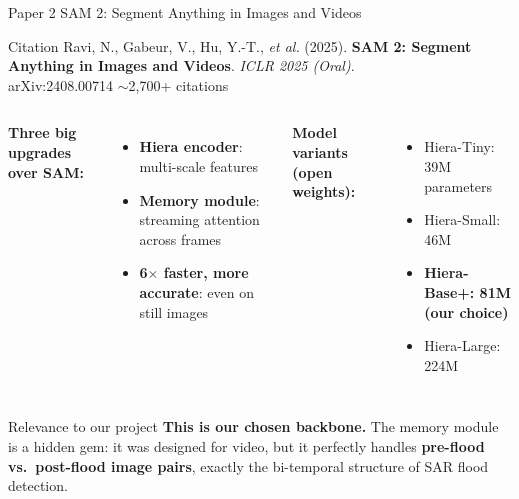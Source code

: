 \documentclass[10pt,aspectratio=169]{beamer}
\begin{document}
\begin{frame}{Paper 2 \quad SAM 2: Segment Anything in Images and Videos}
\begin{block}{Citation}
Ravi, N., Gabeur, V., Hu, Y.-T., \textit{et al.} (2025). \textbf{SAM 2: Segment Anything in Images and Videos}. \textit{ICLR 2025 (Oral)}. \\
\textcolor{primaryblue}{arXiv:2408.00714} \quad $\sim$2{,}700+ citations
\end{block}

\begin{columns}[T,onlytextwidth]
\textbf{Three big upgrades over SAM:}
\begin{itemize}
\item \textbf{Hiera encoder}: multi-scale features
\item \textbf{Memory module}: streaming attention across frames
\item \textbf{6$\times$ faster, more accurate}: even on still images
\end{itemize}

\textbf{Model variants (open weights):}
\begin{itemize}
\item Hiera-Tiny: 39M parameters
\item Hiera-Small: 46M
\item \textbf{Hiera-Base+: 81M (our choice)}
\item Hiera-Large: 224M
\end{itemize}
\end{columns}

\vspace{0.5em}
\begin{alertblock}{Relevance to our project}
\textbf{This is our chosen backbone.} The memory module is a hidden gem: it was designed for video, but it perfectly handles \textbf{pre-flood vs.\ post-flood image pairs}, exactly the bi-temporal structure of SAR flood detection.
\end{alertblock}
\end{frame}
\end{document}
